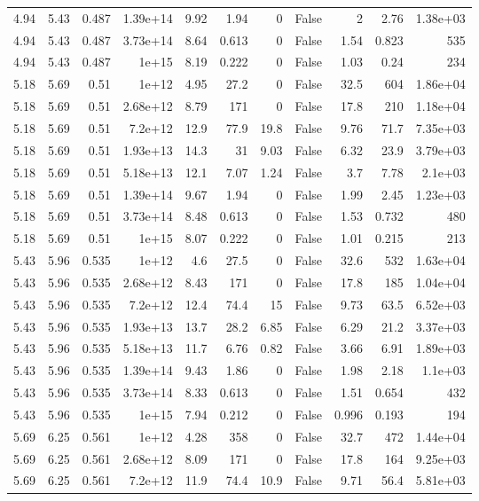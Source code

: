 \begin{table}
\begin{tabular}{rrrrrrrrrrr}
4.94 & 5.43 & 0.487 & 1.39e+14 & 9.92 & 1.94 & 0 & False & 2 & 2.76 & 1.38e+03 \\
4.94 & 5.43 & 0.487 & 3.73e+14 & 8.64 & 0.613 & 0 & False & 1.54 & 0.823 & 535 \\
4.94 & 5.43 & 0.487 & 1e+15 & 8.19 & 0.222 & 0 & False & 1.03 & 0.24 & 234 \\
5.18 & 5.69 & 0.51 & 1e+12 & 4.95 & 27.2 & 0 & False & 32.5 & 604 & 1.86e+04 \\
5.18 & 5.69 & 0.51 & 2.68e+12 & 8.79 & 171 & 0 & False & 17.8 & 210 & 1.18e+04 \\
5.18 & 5.69 & 0.51 & 7.2e+12 & 12.9 & 77.9 & 19.8 & False & 9.76 & 71.7 & 7.35e+03 \\
5.18 & 5.69 & 0.51 & 1.93e+13 & 14.3 & 31 & 9.03 & False & 6.32 & 23.9 & 3.79e+03 \\
5.18 & 5.69 & 0.51 & 5.18e+13 & 12.1 & 7.07 & 1.24 & False & 3.7 & 7.78 & 2.1e+03 \\
5.18 & 5.69 & 0.51 & 1.39e+14 & 9.67 & 1.94 & 0 & False & 1.99 & 2.45 & 1.23e+03 \\
5.18 & 5.69 & 0.51 & 3.73e+14 & 8.48 & 0.613 & 0 & False & 1.53 & 0.732 & 480 \\
5.18 & 5.69 & 0.51 & 1e+15 & 8.07 & 0.222 & 0 & False & 1.01 & 0.215 & 213 \\
5.43 & 5.96 & 0.535 & 1e+12 & 4.6 & 27.5 & 0 & False & 32.6 & 532 & 1.63e+04 \\
5.43 & 5.96 & 0.535 & 2.68e+12 & 8.43 & 171 & 0 & False & 17.8 & 185 & 1.04e+04 \\
5.43 & 5.96 & 0.535 & 7.2e+12 & 12.4 & 74.4 & 15 & False & 9.73 & 63.5 & 6.52e+03 \\
5.43 & 5.96 & 0.535 & 1.93e+13 & 13.7 & 28.2 & 6.85 & False & 6.29 & 21.2 & 3.37e+03 \\
5.43 & 5.96 & 0.535 & 5.18e+13 & 11.7 & 6.76 & 0.82 & False & 3.66 & 6.91 & 1.89e+03 \\
5.43 & 5.96 & 0.535 & 1.39e+14 & 9.43 & 1.86 & 0 & False & 1.98 & 2.18 & 1.1e+03 \\
5.43 & 5.96 & 0.535 & 3.73e+14 & 8.33 & 0.613 & 0 & False & 1.51 & 0.654 & 432 \\
5.43 & 5.96 & 0.535 & 1e+15 & 7.94 & 0.212 & 0 & False & 0.996 & 0.193 & 194 \\
5.69 & 6.25 & 0.561 & 1e+12 & 4.28 & 358 & 0 & False & 32.7 & 472 & 1.44e+04 \\
5.69 & 6.25 & 0.561 & 2.68e+12 & 8.09 & 171 & 0 & False & 17.8 & 164 & 9.25e+03 \\
5.69 & 6.25 & 0.561 & 7.2e+12 & 11.9 & 74.4 & 10.9 & False & 9.71 & 56.4 & 5.81e+03 \\

\end{tabular}
\end{table}
